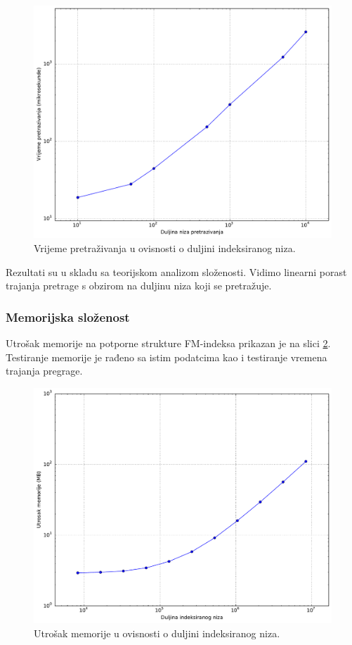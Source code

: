 \documentclass[times, utf8, seminar, numeric]{fer}
\begin{document}
\begin{figure}[!htb]
\centering
\includegraphics[width=\textwidth]{fig/test_res_query_len.pdf}
\caption{Vrijeme pretraživanja u ovisnosti o duljini indeksiranog niza.}
\label{fig:test_res_query_len_time}
\end{figure}

Rezultati su u skladu sa teorijskom analizom složenosti. Vidimo linearni porast
trajanja pretrage s obzirom na duljinu niza koji se pretražuje.

\subsubsection{Memorijska složenost}

Utrošak memorije na potporne strukture FM-indeksa prikazan je na slici \ref{fig:test_res_seq_len_mem}.
Testiranje memorije je rađeno sa istim podatcima kao i testiranje vremena trajanja pregrage.

\begin{figure}[!htb]
\centering
\includegraphics[width=\textwidth]{fig/test_res_seq_len_mem.pdf}
\caption{Utrošak memorije u ovisnosti o duljini indeksiranog niza.}
\label{fig:test_res_seq_len_mem}
\end{figure}
\end{document}
